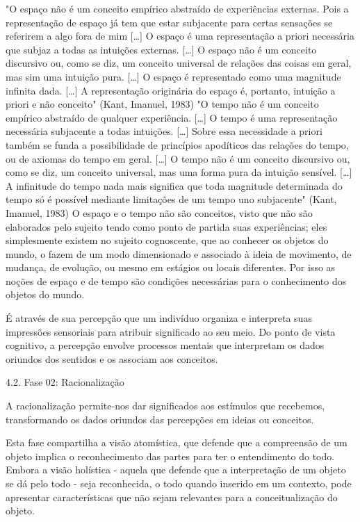 "O espaço não é um conceito empírico abstraído de experiências externas. Pois a representação de espaço já tem que estar subjacente para certas sensações se referirem a algo fora de mim […] O espaço é uma representação a priori necessária que subjaz a todas as intuições externas. […] O espaço não é um conceito discursivo ou, como se diz, um conceito universal de relações das coisas em geral, mas sim uma intuição pura. […] O espaço é representado como uma magnitude infinita dada. […] A representação originária do espaço é, portanto, intuição a priori e não conceito" (Kant, Imanuel, 1983)
"O tempo não é um conceito empírico abstraído de qualquer experiência. […] O tempo é uma representação necessária subjacente a todas intuições. […] Sobre essa necessidade a priori também se funda a possibilidade de princípios apodíticos das relações do tempo, ou de axiomas do tempo em geral. […] O tempo não é um conceito discursivo ou, como se diz, um conceito universal, mas uma forma pura da intuição sensível. […] A infinitude do tempo nada mais significa que toda magnitude determinada do tempo só é possível mediante limitações de um tempo uno subjacente" (Kant, Imanuel, 1983)
O espaço e o tempo não são conceitos, visto que não são elaborados pelo sujeito tendo como ponto de partida suas experiências; eles simplesmente existem no sujeito cognoscente, que ao conhecer os objetos do mundo, o fazem de um modo dimensionado e associado à ideia de movimento, de mudança, de evolução, ou mesmo em estágios ou locais diferentes. Por isso as noções de espaço e de tempo são condições necessárias para o conhecimento dos objetos do mundo.

É através de sua percepção que um indivíduo organiza e interpreta suas impressões sensoriais para atribuir significado ao seu meio. Do ponto de vista cognitivo, a percepção envolve processos mentais que interpretam os dados oriundos dos sentidos e os associam aos conceitos.

4.2. Fase 02: Racionalização

A racionalização permite-nos dar significados aos estímulos que recebemos, transformando os dados oriundos das percepções em ideias ou conceitos.

Esta fase compartilha a visão atomística, que defende que a compreensão de um objeto implica o reconhecimento das partes para ter o entendimento do todo. Embora a visão holística - aquela que defende que a interpretação de um objeto se dá pelo todo - seja reconhecida, o todo quando inserido em um contexto, pode apresentar características que não sejam relevantes para a conceitualização do objeto.


